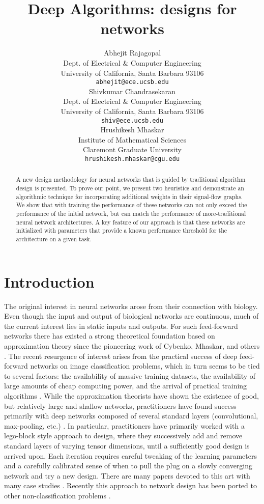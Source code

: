 \documentclass{article}
\title{Deep Algorithms: designs for networks}
\author{
  Abhejit Rajagopal \\ %
  Dept. of Electrical \& Computer Engineering\\
  University of California, Santa Barbara 93106\\
  \texttt{abhejit@ece.ucsb.edu} \\
   \And
   Shivkumar Chandrasekaran \\
   Dept. of Electrical \& Computer Engineering \\
   University of California, Santa Barbara 93106 \\
   \texttt{shiv@ece.ucsb.edu} \\
   \AND
    Hrushikesh Mhaskar \\
    Institute of Mathematical Sciences \\
    Claremont Graduate University \\
    \texttt{hrushikesh.mhaskar@cgu.edu}
}
\begin{document}
\maketitle

\begin{abstract}
    A new design methodology for neural networks that is guided by traditional algorithm design is presented. To prove our point, we present two heuristics and demonstrate an algorithmic technique for incorporating additional weights in their signal-flow graphs. We show that with training the performance of these networks can not only exceed the performance of the initial network, but can match the performance of more-traditional neural network architectures. A key feature of our approach is that these networks are initialized with parameters that provide a known performance threshold for the architecture on a given task.
\end{abstract}

\section{Introduction}
The original interest in neural networks arose from their connection with biology. Even though the input and output of biological networks are continuous, much of the current interest lies in static inputs and outputs. For such feed-forward networks there has existed a strong theoretical foundation based on approximation theory since the pioneering work of Cybenko, Mhaskar, and others \cite{cybenko1989approximation,mhaskar1992approximation,chui2016deep}. The recent resurgence of interest arises from the practical success of deep feed-forward networks on image classification problems, which in turn seems to be tied to several factors: the availability of massive training datasets, the availability of large amounts of cheap computing power, and the arrival of practical training algorithms \cite{rumelhart1986learning,taylor2010convolutional}. While the approximation theorists have shown the existence of good, but relatively large and shallow networks, practitioners have found success primarily with deep networks composed of several standard layers (convolutional, max-pooling, etc.) \cite{suzuki1998constructive,hornik1991approximation}. In particular, practitioners have primarily worked with a lego-block style approach to design, where they successively add and remove standard layers of varying tensor dimensions, until a sufficiently good design is arrived upon. Each iteration requires careful tweaking of the learning parameters and a carefully calibrated sense of when to pull the plug on a slowly converging network and try a new design. There are many papers devoted to this art with many case studies \cite{haykin2004comprehensive}. Recently this approach to network design has been ported to other non-classification problems \cite{kim2018communication}.
\end{document}
